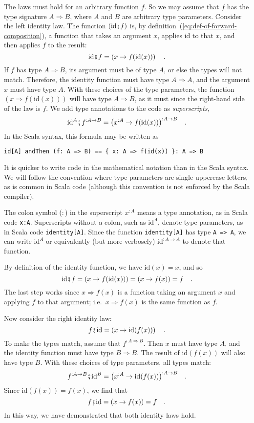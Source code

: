 The laws must hold for an arbitrary function $f$. So we may assume
that $f$ has the type signature $A\Rightarrow B$, where $A$ and
$B$ are arbitrary type parameters. Consider the left identity law.
The function $\left(\text{id}\bef f\right)$ is, by definition~(\ref{eq:def-of-forward-composition}),
a function that takes an argument $x$, applies $\text{id}$ to that
$x$, and then applies $f$ to the result: 
\[
\text{id}\bef f=\left(x\Rightarrow f(\text{id}(x))\right)\quad.
\]
If $f$ has type $A\Rightarrow B$, its argument must be of type $A$,
or else the types will not match. Therefore, the identity function
must have type $A\Rightarrow A$, and the argument $x$ must have
type $A$. With these choices of the type parameters, the function
$\left(x\Rightarrow f(\text{id}(x))\right)$ will have type $A\Rightarrow B$,
as it must since the right-hand side of the law is $f$. We add type
annotations to the code as \emph{superscripts},
\[
\text{id}^{A}\bef f^{:A\Rightarrow B}=\big(x^{:A}\Rightarrow f(\text{id}(x))\big)^{:A\Rightarrow B}\quad.
\]
In the Scala syntax, this formula may be written as
\begin{lstlisting}
id[A] andThen (f: A => B) == { x: A => f(id(x)) }: A => B
\end{lstlisting}
It is quicker to write code in the mathematical notation than in the
Scala syntax. We will follow the convention where type parameters
are single uppercase letters, as is common in Scala code (although
this convention is not enforced by the Scala compiler).

The colon symbol ($:$) in the superscript $x^{:A}$ means a type
annotation, as in Scala code \lstinline!x:A!. Superscripts without
a colon, such as $\text{id}^{A}$, denote type parameters, as in Scala
code \lstinline!identity[A]!. Since the function \lstinline!identity[A]!
has type \lstinline!A => A!, we can write $\text{id}^{A}$ or equivalently
(but more verbosely) $\text{id}^{:A\Rightarrow A}$ to denote that
function.

By definition of the identity function, we have $\text{id}(x)=x$,
and so 
\[
\text{id}\bef f=\left(x\Rightarrow f(\text{id}(x))\right)=\left(x\Rightarrow f(x)\right)=f\quad.
\]
The last step works since $x\Rightarrow f(x)$ is a function taking
an argument $x$ and applying $f$ to that argument; i.e.~$x\Rightarrow f(x)$
is the same function as $f$.

Now consider the right identity law:
\[
f\bef\text{id}=\left(x\Rightarrow\text{id}(f(x))\right)\quad.
\]
To make the types match, assume that $f^{:A\Rightarrow B}$. Then
$x$ must have type $A$, and the identity function must have type
$B\Rightarrow B$. The result of $\text{id}(f(x))$ will also have
type $B$. With these choices of type parameters, all types match:
\[
f^{:A\Rightarrow B}\bef\text{id}^{B}=\big(x^{:A}\Rightarrow\text{id}(f(x))\big)^{:A\Rightarrow B}\quad.
\]
Since $\text{id}(f(x))=f(x)$, we find that 
\[
f\bef\text{id}=\left(x\Rightarrow f(x)\right)=f\quad.
\]
In this way, we have demonstrated that both identity laws hold. 

